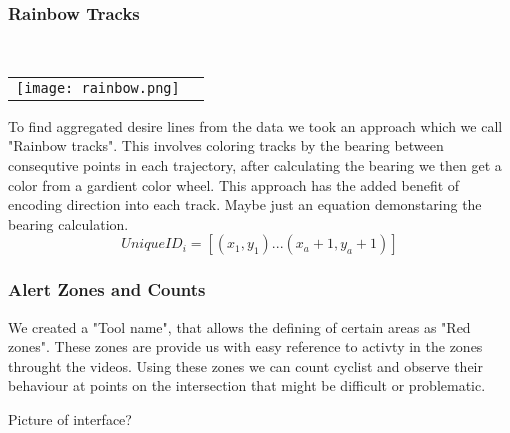 \subsubsection{Rainbow Tracks}

\ \\ 
\noindent
\begin{tabular}{@{}cc}
\texttt{[image: rainbow.png]} 
\end{tabular}
\label{Rainbow}

To find aggregated desire lines from the data we took an approach which we call "Rainbow tracks". This involves coloring tracks by the bearing between consequtive points in each 
trajectory, after calculating the bearing we then get a color from a gardient color wheel. This approach has the added benefit of encoding direction into 
each track.
Maybe just an equation demonstaring the bearing calculation.
\ \\ 
\begin{equation}
  UniqueID_i = [(x_1, y_1)...(x_a+1, y_a+1)]\label{eq:3}
\end{equation}

\subsubsection{Alert Zones and Counts}

We created a "Tool name", that allows the defining of certain areas as "Red zones". These zones are provide us with easy reference to activty in the zones throught the videos.
Using these zones we can count cyclist and observe their behaviour at points on the intersection that might be difficult or
problematic.

Picture of interface?
